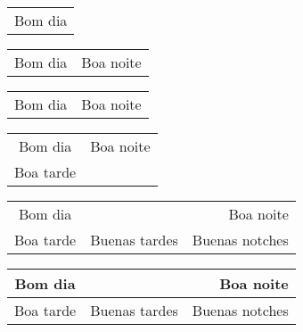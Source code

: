 \documentclass{article}
\begin{document}

  \begin{tabular}{c}
    Bom dia
  \end{tabular}

  \begin{tabular}{cl}
    Bom dia & Boa noite
  \end{tabular}

  \begin{tabular}{c | l}
    Bom dia & Boa noite
  \end{tabular}

  \begin{tabular}{c | l}
    Bom dia & Boa noite \\
    Boa tarde & %
  \end{tabular}

  \begin{tabular}{c | l | r}
    Bom dia &  & Boa noite \\
    Boa tarde & Buenas tardes & Buenas notches
  \end{tabular}
  
  \begin{tabular}{c | l | r}
    \hline  %
	  Bom dia   &               & Boa noite      \\ \hline %
    Boa tarde & Buenas tardes & Buenas notches \\ %
    \hline %
  \end{tabular}
\end{document}
